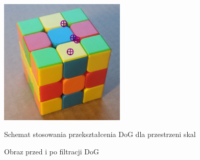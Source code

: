    \begin{figure}[h]
      \centering
      \includegraphics[width=6cm]{SIFT_cube_points.png}
      \label {fig:G2DoG}
      \caption{Schemat stosowania przekształcenia DoG dla przestrzeni skal}
      \label {fig:DoGT}
   \end{figure}

   \begin{figure}[h]
      \centering
      \smallskip{ }
      \smallskip{ }
   \caption{Obraz przed i po filtracji DoG}
   \label {fig:DoG}
   \end{figure}

